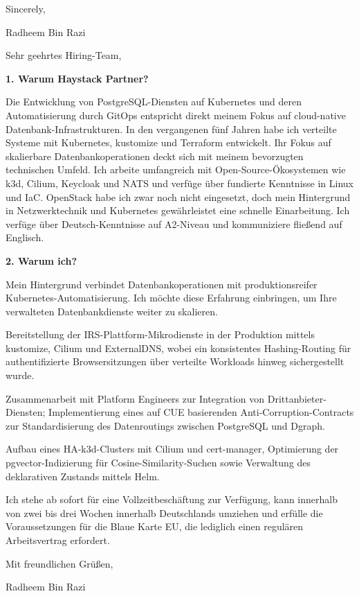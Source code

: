 \documentclass[11pt,a4paper]{coverletter}
\begin{document}
\closing{Sincerely,}{Radheem Bin Razi}

\clearpage
{}


\opening{Sehr geehrtes Hiring-Team,}

\vspace{8pt}\noindent\textbf{1. Warum Haystack Partner?}\par\vspace{3pt}

Die Entwicklung von PostgreSQL-Diensten auf Kubernetes und deren Automatisierung durch GitOps entspricht direkt meinem Fokus auf cloud-native Datenbank-Infrastrukturen. In den vergangenen fünf Jahren habe ich verteilte Systeme mit Kubernetes, kustomize und Terraform entwickelt. Ihr Fokus auf skalierbare Datenbankoperationen deckt sich mit meinem bevorzugten technischen Umfeld. Ich arbeite umfangreich mit Open-Source-Ökosystemen wie k3d, Cilium, Keycloak und NATS und verfüge über fundierte Kenntnisse in Linux und IaC. OpenStack habe ich zwar noch nicht eingesetzt, doch mein Hintergrund in Netzwerktechnik und Kubernetes gewährleistet eine schnelle Einarbeitung. Ich verfüge über Deutsch-Kenntnisse auf A2-Niveau und kommuniziere fließend auf Englisch.

\vspace{8pt}\noindent\textbf{2. Warum ich?}\par\vspace{3pt}

Mein Hintergrund verbindet Datenbankoperationen mit produktionsreifer Kubernetes-Automatisierung. Ich möchte diese Erfahrung einbringen, um Ihre verwalteten Datenbankdienste weiter zu skalieren.

\bullets

  \item Bereitstellung der IRS-Plattform-Mikrodienste in der Produktion mittels kustomize, Cilium und ExternalDNS, wobei ein konsistentes Hashing-Routing für authentifizierte Browsersitzungen über verteilte Workloads hinweg sichergestellt wurde.

  \item Zusammenarbeit mit Platform Engineers zur Integration von Drittanbieter-Diensten; Implementierung eines auf CUE basierenden Anti-Corruption-Contracts zur Standardisierung des Datenroutings zwischen PostgreSQL und Dgraph.

  \item Aufbau eines HA-k3d-Clusters mit Cilium und cert-manager, Optimierung der pgvector-Indizierung für Cosine-Similarity-Suchen sowie Verwaltung des deklarativen Zustands mittels Helm.

\bulletsend

Ich stehe ab sofort für eine Vollzeitbeschäftung zur Verfügung, kann innerhalb von zwei bis drei Wochen innerhalb Deutschlands umziehen und erfülle die Voraussetzungen für die Blaue Karte EU, die lediglich einen regulären Arbeitsvertrag erfordert.

\closing{Mit freundlichen Grüßen,}{Radheem Bin Razi}
\end{document}
